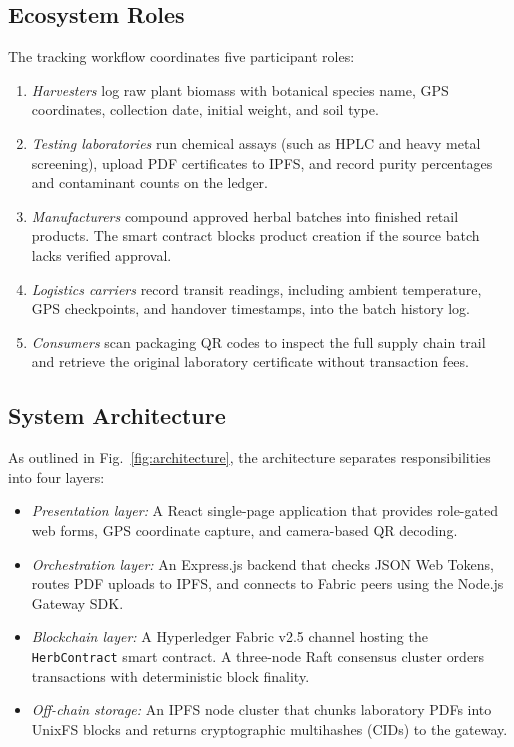 \documentclass[conference]{IEEEtran}
\begin{document}
\subsection{Ecosystem Roles}
The tracking workflow coordinates five participant roles:
\begin{enumerate}
    \item \emph{Harvesters} log raw plant biomass with botanical species name, GPS coordinates, collection date, initial weight, and soil type.
    \item \emph{Testing laboratories} run chemical assays (such as HPLC and heavy metal screening), upload PDF certificates to IPFS, and record purity percentages and contaminant counts on the ledger.
    \item \emph{Manufacturers} compound approved herbal batches into finished retail products. The smart contract blocks product creation if the source batch lacks verified approval.
    \item \emph{Logistics carriers} record transit readings, including ambient temperature, GPS checkpoints, and handover timestamps, into the batch history log.
    \item \emph{Consumers} scan packaging QR codes to inspect the full supply chain trail and retrieve the original laboratory certificate without transaction fees.
\end{enumerate}

\subsection{System Architecture}
As outlined in Fig.~\ref{fig:architecture}, the architecture separates responsibilities into four layers:
\begin{itemize}
    \item \emph{Presentation layer:} A React single-page application that provides role-gated web forms, GPS coordinate capture, and camera-based QR decoding.
    \item \emph{Orchestration layer:} An Express.js backend that checks JSON Web Tokens, routes PDF uploads to IPFS, and connects to Fabric peers using the Node.js Gateway SDK.
    \item \emph{Blockchain layer:} A Hyperledger Fabric v2.5 channel hosting the \texttt{HerbContract} smart contract. A three-node Raft consensus cluster \cite{ongaro2014search} orders transactions with deterministic block finality.
    \item \emph{Off-chain storage:} An IPFS node cluster that chunks laboratory PDFs into UnixFS blocks and returns cryptographic multihashes (CIDs) to the gateway.
\end{itemize}
\end{document}
